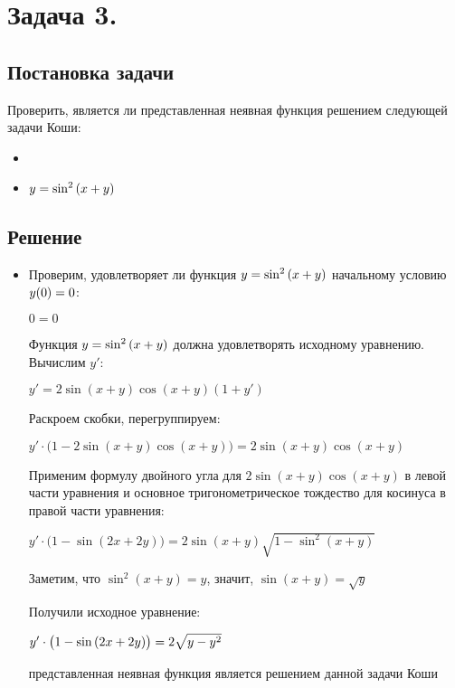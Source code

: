 

\section{Задача 3.}
\subsection{Постановка задачи}
Проверить, является ли представленная неявная функция решением следующей задачи Коши:
\begin{itemize}[label={}]
	\item
		\customCases
			{\equation}
			{\condition}
	\item
		$ y = \sin^{2}{(x + y)} $
\end{itemize}

\subsection{Решение}

\begin{itemize}[label={}]
	\item
		Проверим, удовлетворяет ли функция $ y = \sin^{2}{(x + y)} $ начальному условию $ y\mathopen{}\left( {0}_{{}_{}}\,\negthickspace\right)\mathclose{} = 0 $:
		
		\subitem 
			$ 0 = 0 $
		
		Функция $ y = \sin^{2}{(x + y)} $ должна удовлетворять исходному уравнению.
		Вычислим $ y' $:
		
		\subitem 
			$ {y}' = 2\sin{(x + y)}\cos{(x + y)}(1 + {y}') $
			
		Раскроем скобки, перегруппируем:	
			
		\subitem	
			$ {y}' \cdot \big(1 - 2\sin{(x + y)}\cos{(x + y)}\big) = 2\sin{(x + y)}\cos{(x + y)} $
			
		Применим формулу двойного угла для $ 2\sin{(x + y)}\cos{(x + y)} $ 
		в левой части уравнения и основное тригонометрическое тождество для косинуса 
		в правой части уравнения:
		
		\subitem 
			$ {y}' \cdot \big(1 - \sin{(2x + 2y)}\big) = 2\sin{(x + y)}\sqrt{1 - \sin^2{(x + y)}} $
			
		Заметим, что $ \sin^2(x + y) = {y} $, значит, $ \sin{(x+y)} = \sqrt{y} $
		
		Получили исходное уравнение:
		
		\subitem
			$ {y}' \cdot \mathopen{}\left( {1 - \sin{(2x + 2y)}}_{{}_{}}\,\negthickspace\right)\mathclose{} = 2\sqrt{y - y^{2}} $
			
		\answer представленная неявная функция является решением данной задачи Коши
\end{itemize}
